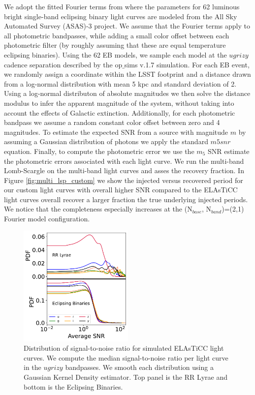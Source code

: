 \documentclass[DM,authoryear,toc]{lsstdoc}
\begin{document}
We adopt the fitted Fourier terms from \citet{Deb:Deb11} where the parameters for 62 luminous bright single-band eclipsing binary light curves are modeled from the All Sky Automated Survey
(ASAS)-3 project.
We assume that the Fourier terms apply to all photometric bandpasses, while adding a small color offset between each photometric filter (by roughly assuming that these are equal temperature eclipsing binaries).
Using the 62 EB models, we sample each model at the $ugrizy$ cadence separation described by the op$\_$sims v.1.7 simulation.
For each EB event, we randomly assign a coordinate within the LSST footprint and a distance drawn from a log-normal distribution with mean 5 kpc and standard deviation of 2.
Using a log-normal distributon of absolute magnitudes we then solve the distance modulus to infer the apparent magnitude of the system, without taking into account the effects of Galactic extinction.
Additionally, for each photometric bandpass we assume a random constant color offset between zero and 4 magnitudes.
To estimate the expected SNR from a source with magnitude $m$ by assuming a Gaussian distribution of photons we apply the standard $m5snr$ equation.
Finally, to compute the photometric error we use the $m_5$ SNR estimate the photometric errors associated with each light curve.
We run the multi-band Lomb-Scargle on the multi-band light curves and asses the recovery fraction.
In Figure \ref{fig:multi_lsp_custom} we show the injected versus recovered period for our custom light curves with overall higher SNR compared to the 
ELAsTiCC light curves overall recover a larger fraction the true underlying injected periods.
We notice that the completeness especially increases at the (N$_{base}$, N$_{band}$)=(2,1) Fourier model configuration.

\begin{figure}
  \includegraphics[width=0.5\textwidth]{figures/snr_average.pdf}
  \centering 
  \caption{Distribution of signal-to-noise ratio for simulated ELAsTiCC light curves. We compute the median signal-to-noise ratio per light curve in the $ugrizy$ bandpasses.
 We smooth each distribution using a Gaussian Kernel Density estimator.
Top panel is the RR Lyrae and bottom is the Eclipsing Binaries.
}
  \label{fig:snr_average}
\end{figure}
\end{document}
